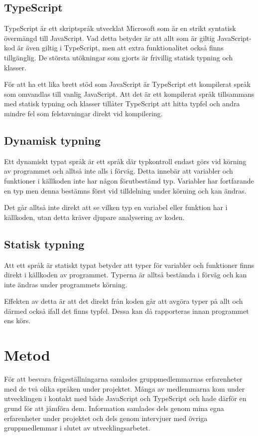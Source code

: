 \subsection{TypeScript}
TypeScript är ett skriptspråk utvecklat Microsoft som är en strikt syntatisk övermängd till JavaScript. \cite{henrik_ts1} Vad detta betyder är att allt som är giltig JavaScript-kod är även giltig i TypeScript, men att extra funktionalitet också finns tillgänglig. De största utökningar som gjorts är frivillig statisk typning och klasser.

För att ha ett lika brett stöd som JavaScript är TypeScript ett kompilerat språk som omvandlas till vanlig JavaScript. Att det är ett kompilerat språk tillsammans med statisk typning och klasser tillåter TypeScript att hitta typfel och andra mindre fel som felstavningar direkt vid kompilering.
\subsection{Dynamisk typning}
Ett dynamiskt typat språk är ett språk där typkontroll endast görs vid körning av programmet och alltså inte alls i förväg. Detta innebär att variabler och funktioner i källkoden inte har någon förutbestämd typ. Variabler har fortfarande en typ men denna bestämns först vid tilldelning under körning och kan ändras.

Det går alltså inte direkt att se vilken typ en variabel eller funktion har i källkoden, utan detta kräver djupare analysering av koden.
\subsection{Statisk typning}
Att ett språk är statiskt typat betyder att typer för variabler och funktioner finns direkt i källkoden av programmet. Typerna är alltså bestämda i förväg och kan inte ändras under programmets körning.

Effekten av detta är att det direkt från koden går att avgöra typer på allt och därmed också ifall det finns typfel. Dessa kan då rapporteras innan programmet ens körs.
\section{Metod}
För att besvara frågeställningarna samlades gruppmedlemmarnas erfarenheter med de två olika språken under projektet. Många av medlemmarna kom under utvecklingen i kontakt med både JavaScript och TypeScript och hade därför en grund för att jämföra dem. Information samlades dels genom mina egna erfarenheter under projektet och dels genom intervjuer med övriga gruppmedlemmar i slutet av utvecklingsarbetet.

